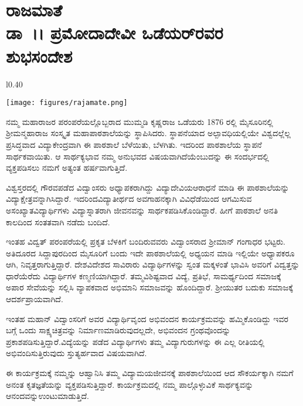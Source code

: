 {\fontsize{14}{16}\selectfont

\chapter[ರಾಜಮಾತೆ ಡಾ~।। ಪ್ರಮೋದಾದೇವಿ ಒಡೆಯರ್ ರವರ ಶುಭಸಂದೇಶ]{ರಾಜಮಾತೆ\\ ಡಾ~।। ಪ್ರಮೋದಾದೇವೀ ಒಡೆಯರ್‌ರವರ\\ ಶುಭಸಂದೇಶ}

\begin{wrapfigure}{l}{0.40\textwidth}
\centerline{\texttt{[image: figures/rajamate.png]}}
\end{wrapfigure}	
ನಮ್ಮ ಮಹಾರಾಜರ ಪರಂಪರೆಯಲ್ಲೊಬ್ಬರಾದ ಮುಮ್ಮಡಿ ಕೃಷ್ಣರಾಜ ಒಡೆಯರು 1876 ರಲ್ಲಿ ಮೈಸೂರಿನಲ್ಲಿ  ಶ್ರೀಮನ್ಮಹಾ\-ರಾಜ ಸಂಸ್ಕೃತ ಮಹಾಪಾಠಶಾಲೆಯನ್ನು ಸ್ಥಾಪಿಸಿ\-ದರು. ಸ್ಥಾಪನೆಯಾದ ಅಲ್ಪಾವಧಿಯಲ್ಲಿಯೇ ವಿಶ್ವದಲ್ಲೆಲ್ಲ  ಪ್ರಸಿದ್ಧ\-ವಾದ ವಿದ್ಯಾಕೇಂದ್ರವಾಗಿ ಈ ಪಾಠಶಾಲೆ ಬೆಳೆಯಿತು, \hbox{ಬೆಳಗಿತು}. ಇದರಿಂದ ಪಾಠಶಾಲೆಯ ಸ್ಥಾಪನೆ ಸಾರ್ಥಕ\-ವಾಯಿತು. ಆ ಸಾರ್ಥಕ್ಯಭಾವ ನಮ್ಮ ಅನುಭವದ ವಿಷಯವಾಗಿದೆಯೆಂಬುದನ್ನು ಈ ಸಂದರ್ಭದಲ್ಲಿ ವ್ಯಕ್ತಪಡಿಸಲು ನಮಗೆ ಅತ್ಯಂತ ಹರ್ಷವಾಗುತ್ತಿದೆ.
\vskip 8pt

ವಿಶ್ವಸ್ತರದಲ್ಲಿ ಗೌರವಪಡೆದ ವಿದ್ವಾಂಸರು ಅಧ್ಯಾಪಕರಾಗಿದ್ದು ವಿದ್ಯಾದೇವಿಯ\break ಆರಾಧನೆ ಮಾಡಿ ಈ ಪಾಠಶಾಲೆಯನ್ನು ವಿದ್ಯಾಕ್ಷೇತ್ರವನ್ನಾಗಿಸಿದ್ದಾರೆ. ಇದರಿಂದ\break ವಿದ್ಯಾತೀರ್ಥದ ಅವಗಾಹನಕ್ಕಾಗಿ ವಿವಿಧೆಡೆಯಿಂದ ಆಗಮಿಸುವ ಅಸಂಖ್ಯಾತ\break ವಿದ್ಯಾರ್ಥಿಗಳು ವಿದ್ಯಾಸ್ನಾತರಾಗಿ ಜೀವನವನ್ನು ಸಾರ್ಥಕಪಡಿಸಿಕೊಂಡಿದ್ದಾರೆ. ಹೀಗೆ ಪಾಠಶಾಲೆ ಅನತಿ ಕಾಲದಿಂದ ಸಂತತವಾಗಿ ನಡೆದು ಬಂದಿದೆ.
\vskip 8pt

ಇಂತಹ ವಿದ್ವತ್ ಪರಂಪರೆಯಲ್ಲಿ ಪ್ರಕೃತ ಬೆಳಕಿಗೆ ಬಂದಿರುವವರು ವಿದ್ವಾಂಸರಾದ ಶ್ರೀಮಾನ್ ಗಂಗಾಧರ ಭಟ್ಟರು.  ಅತಿದೂರದ ಸಿದ್ದಾಪುರದಿಂದ ಮೈಸೂರಿಗೆ ಬಂದು ಇದೇ ಪಾಠಶಾಲೆಯಲ್ಲಿ ಅಧ್ಯಯನ ಮಾಡಿ ಇಲ್ಲಿಯೇ ಅಧ್ಯಾಪಕರೂ ಆಗಿ, ನಿವೃತ್ತರಾಗು\-ತ್ತಿದ್ದಾರೆ. ದೇಶ\enginline{-}ವಿದೇಶದ ಸಾವಿರಾರು ವಿದ್ಯಾರ್ಥಿಗಳನ್ನು ಸ್ವಂತ ಮಕ್ಕಳಂತೆ ಭಾವಿಸಿ ಅವರಿಗೆ ವಿದ್ವತ್ತನ್ನು ಧಾರೆಯೆರೆದು ವಿದ್ಯಾರ್ಥಿಗಳ ಕಣ್ಮಣಿಯಾಗಿದ್ದಾರೆ. ತಮ್ಮ\break ವಿಶಿಷ್ಟವಾದ ವಿದ್ಯೆ, ಪ್ರತಿಭೆ, ಸಾಮರ್ಥ್ಯದಿಂದ ಸಮಾಜಕ್ಕೆ ಅಪಾರ ಸೇವೆಯನ್ನು ಸಲ್ಲಿಸಿ ವ್ಯಾಪಕವಾದ ಅಭಿಮಾನಿ ಸಮಾಜವನ್ನು ಹೊಂದಿದ್ದಾರೆ. ಶ್ರೀಯುತರ ಬದುಕು ಸಮಾಜಕ್ಕೆ ಆದರ್ಶಪ್ರಾಯವಾಗಿದೆ. 

ಇಂತಹ ಮಹಾನ್ ವಿದ್ವಾಂಸರಿಗೆ ಅವರ ವಿದ್ಯಾರ್ಥಿವೃಂದ ಅಭಿವಂದನ ಕಾರ್ಯ\-ಕ್ರಮವನ್ನು ಹಮ್ಮಿಕೊಂಡಿದ್ದು ಇವರ ಬಗ್ಗೆ ಒಂದು ಸಾಕ್ಷ್ಯಚಿತ್ರವನ್ನು ನಿರ್ಮಾಣ\break ಮಾಡಿರುವುದಲ್ಲದೇ, ಅಭಿವಂದನ ಗ್ರಂಥವೊಂದನ್ನು ಪ್ರಕಾಶಪಡಿಸುತ್ತಿದ್ದಾರೆ.\break ವಿದ್ಯೆಯನ್ನು ಪಡೆದ ವಿದ್ಯಾರ್ಥಿಗಳು ತಮ್ಮ ವಿದ್ಯಾಗುರುಗಳನ್ನು ಈ ಎಲ್ಲ ರೀತಿಯಲ್ಲಿ ಅಭಿವಂದಿಸುತ್ತಿರುವುದು  ಸ್ತುತ್ಯರ್ಹವಾದ ವಿಷಯವಾಗಿದೆ. 

ಈ ಕಾರ್ಯಕ್ರಮಕ್ಕೆ ನಮ್ಮನ್ನು ಆಹ್ವಾನಿಸಿ ತಮ್ಮ ವಿದ್ಯಾಮಯಜೀವನಕ್ಕೆ ಪಾಠಶಾಲೆ\-ಯಿಂದ ಆದ ಸೌಕರ್ಯಕ್ಕಾಗಿ ನಮಗೆ ಅನಂತ ಕೃತಜ್ಞತೆಯನ್ನು \hbox{ವ್ಯಕ್ತಪಡಿಸುತ್ತಿದ್ದಾರೆ}. ಕಾರ್ಯಕ್ರಮದಲ್ಲಿ ನಮ್ಮ ಪಾಲ್ಗೊಳ್ಳುವಿಕೆ ಸಾರ್ಥಕ್ಯವನ್ನು ಆನಂದವನ್ನು\break ಉಂಟುಮಾಡುತ್ತಿದೆ.

}
